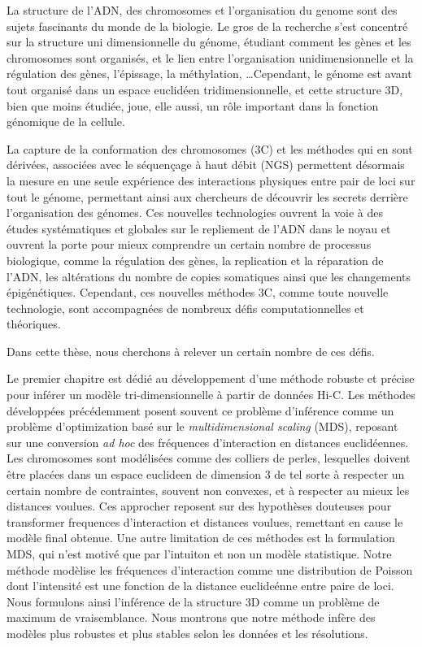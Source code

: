 \begin{resumes}

La structure de l'ADN, des chromosomes et l'organisation du genome sont des
sujets fascinants du monde de la biologie. Le gros de la recherche s'est
concentré sur la structure uni dimensionnelle du génome, étudiant comment les
gènes et les chromosomes sont organisés, et le lien entre l'organisation
unidimensionnelle et la régulation des gènes, l'épissage, la méthylation,
\dots Cependant, le génome est avant tout organisé dans un espace euclidéen
tridimensionnelle, et cette structure 3D, bien que moins étudiée, joue, elle
aussi, un rôle important dans la fonction génomique de la cellule.

La capture de la conformation des chromosomes (3C) et les méthodes qui en sont
dérivées, associées avec le séquençage à haut débit (NGS) permettent désormais
la mesure en une seule expérience des interactions physiques entre pair de
loci sur tout le génome, permettant ainsi aux chercheurs de découvrir les
secrets derrière l'organisation des génomes. Ces nouvelles technologies
ouvrent la voie à des études systématiques et globales sur le repliement de
l'ADN dans le noyau et ouvrent la porte pour mieux comprendre un certain
nombre de processus biologique, comme la régulation des gènes, la replication
et la réparation de l'ADN, les altérations du nombre de copies somatiques ainsi
que les changements épigénétiques. Cependant, ces nouvelles méthodes 3C, comme
toute nouvelle technologie, sont accompagnées de nombreux défis
computationnelles et théoriques.

Dans cette thèse, nous cherchons à relever un certain nombre de ces défis.

Le premier chapitre est dédié au développement d'une méthode robuste et
précise pour inférer un modèle tri-dimensionnelle à partir de données Hi-C.
Les méthodes développées précédemment posent souvent ce problème d'inférence
comme un problème d'optimization basé sur le {\em multidimensional scaling}
(MDS), reposant sur une conversion {\em ad hoc} des fréquences d'interaction
en distances euclidéennes. Les chromosomes sont modélisées comme des colliers
de perles, lesquelles doivent être placées dans un espace euclideen de
dimension 3 de tel sorte à respecter un certain nombre de contraintes, souvent
non convexes, et à respecter au mieux les distances voulues. Ces approcher
reposent sur des hypothèses douteuses pour transformer frequences
d'interaction et distances voulues, remettant en cause le modèle final
obtenue. Une autre limitation de ces méthodes est la formulation MDS, qui
n'est motivé que par l'intuiton et non un modèle statistique. Notre méthode
modèlise les fréquences d'interaction comme une distribution de Poisson dont
l'intensité est une fonction de la distance euclideénne entre paire de loci.
Nous formulons ainsi l'inférence de la structure 3D comme un problème de
maximum de vraisemblance. Nous montrons que notre méthode infère des modèles
plus robustes et plus stables selon les données et les résolutions.


\end{resumes}
